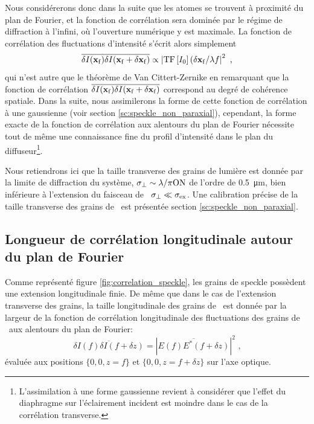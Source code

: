 Nous considérerons donc dans la suite que les atomes se trouvent à proximité du plan de Fourier, et la fonction de corrélation sera dominée par le régime de diffraction à l'infini, où l'ouverture numérique y est maximale. La fonction de corrélation des fluctuations d'intensité s'écrit alors simplement
\begin{equation}
\overline{\delta I (\mathbf{x}_{\mathrm{f}}) \delta I (\mathbf{x}_{\mathrm{f}} + \delta \mathbf{x}_{\mathrm{f}})} \propto \left| \mathrm{TF} \left[ I_0 \right] (\delta \mathbf{x}_{\mathrm{f}} / \lambda f \right| ^2 \text{ ,}
\end{equation}
qui n'est autre que le théorème de Van Cittert-Zernike en remarquant que la fonction de corrélation $\overline{\delta I(\mathbf{x}_{\mathrm{f}})\delta I(\mathbf{x}_{\mathrm{f}}+\delta\mathbf{x}_{\mathrm{f}})}$ correspond au degré de cohérence spatiale.
Dans la suite, nous assimilerons la forme de cette fonction de corrélation à une gaussienne (voir section \ref{sc:speckle_non_paraxial}), cependant, la forme exacte de la fonction de corrélation aux alentours du plan de Fourier nécessite tout de même une connaissance fine du profil d'intensité dans le plan du diffuseur\footnote{L'assimilation à une forme gaussienne revient à considérer que l'effet du diaphragme sur l'éclairement incident est moindre dans le cas de la corrélation transverse.}. 

Nous retiendrons ici que la taille transverse des grains de lumière est donnée par la limite de diffraction du système, $\sigma_{\perp}\sim \lambda/\pi\mathrm{ON}$ de l'ordre de \SI{0.5}{\micro\metre}, bien inférieure à l'extension du faisceau de \speckle\ $\sigma_{\perp} \ll \sigma_{\mathrm{ex}}$. Une calibration précise de la taille transverse des grains de \speckle\ est présentée section \ref{sc:speckle_non_paraxial}.




\subsection{Longueur de corrélation longitudinale autour du plan de Fourier}
\label{sc:correlation_longitudinale}
Comme représenté figure \ref{fig:correlation_speckle}, les grains de speckle possèdent une extension longitudinale finie. De même que dans le cas de l'extension transverse des grains, la taille longitudinale des grains de \speckle\ est donnée par la largeur de la fonction de corrélation longitudinale des fluctuations des grains de \speckle\ aux alentours du plan de Fourier:
\begin{equation}
\overline{\delta I(f) \delta I( f + \delta z)}=\left| \overline{E(f) E^*(f+\delta z)} \right|^2 \text{ ,}
\label{eq:correlation_intensite_longitudinale}
\end{equation}
évaluée aux positions $\lbrace 0,0,z=f \rbrace$ et $\lbrace 0,0,z=f+\delta z \rbrace$ sur l'axe optique.

